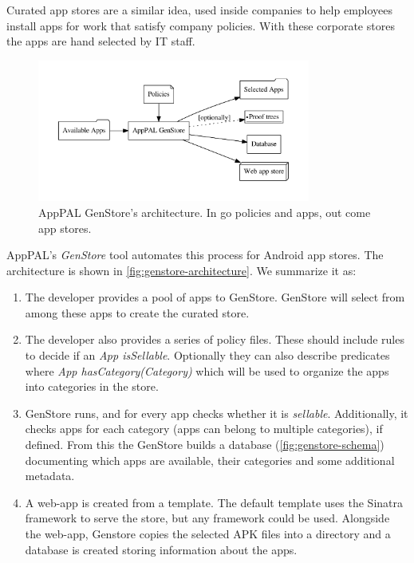 \documentclass[thesis.tex]{subfiles}
\begin{document}
Curated app stores are a similar idea, used inside companies to help employees
install apps for work that satisfy company policies.  With these corporate stores the apps are hand selected
by IT staff.  

\begin{figure}\centering
  \includegraphics[width=0.8\textwidth]{figures/genstore.pdf}
  \caption[AppPAL GenStore's architecture.]{AppPAL GenStore's architecture.  In go policies and apps, out come app stores.}
  \label{fig:genstore-architecture}
\end{figure}

AppPAL's \emph{GenStore} tool automates this process for Android app stores. The
architecture is shown in \autoref{fig:genstore-architecture}. We summarize it
as:

\begin{enumerate}
\item The developer provides a pool of apps to GenStore. GenStore will select
  from among these apps to create the curated store.
\item The developer also provides a series of policy files. These should include
  rules to decide if an \emph{App isSellable}. Optionally they can also describe
  predicates where \emph{App hasCategory(Category)} which will be used to organize
  the apps into categories in the store.
\item GenStore runs, and for every app checks whether it is \emph{sellable}.
  Additionally, it checks apps for each category (apps can belong to multiple
  categories), if defined. From this the GenStore builds a database
  (\autoref{fig:genstore-schema}) documenting which apps are available, their
  categories and some additional metadata.
\item A web-app is created from a template. The default template uses the Sinatra
  framework to serve the store, but any framework could be used. Alongside the
  web-app, Genstore copies the selected APK files into a directory and a database
  is created storing information about the apps.
\end{enumerate}
\end{document}
